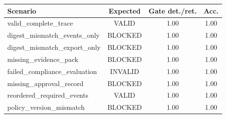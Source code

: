 \begin{tabular}{lccc}
\toprule
Scenario & Expected & Gate det./ret. & Acc. \\
\midrule
valid\_complete\_trace & VALID & 1.00 & 1.00 \\
digest\_mismatch\_events\_only & BLOCKED & 1.00 & 1.00 \\
digest\_mismatch\_export\_only & BLOCKED & 1.00 & 1.00 \\
missing\_evidence\_pack & BLOCKED & 1.00 & 1.00 \\
failed\_compliance\_evaluation & INVALID & 1.00 & 1.00 \\
missing\_approval\_record & BLOCKED & 1.00 & 1.00 \\
reordered\_required\_events & VALID & 1.00 & 1.00 \\
policy\_version\_mismatch & BLOCKED & 1.00 & 1.00 \\
\bottomrule
\end{tabular}
